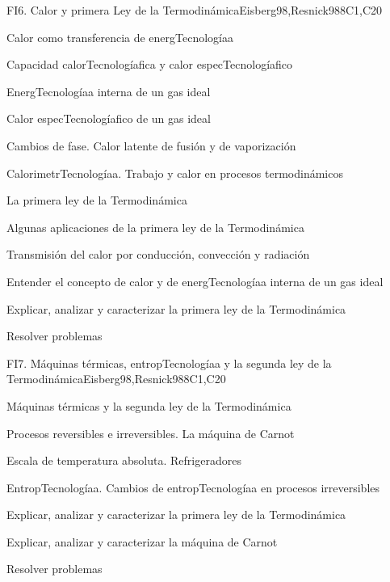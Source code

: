 \begin{syllabus}
\begin{unit}{FI6. Calor y primera Ley de la Termodinámica}{}{Eisberg98,Resnick98}{8}{C1,C20}
\begin{topics}
         \item  Calor como transferencia de energTecnologíaa
	 \item  Capacidad calorTecnologíafica y calor especTecnologíafico
         \item  EnergTecnologíaa interna de un gas ideal
	 \item  Calor especTecnologíafico de un gas ideal
         \item  Cambios de fase. Calor latente de fusión y de vaporización
	 \item  CalorimetrTecnologíaa. Trabajo y calor en procesos termodinámicos
         \item  La primera ley de la Termodinámica
	 \item  Algunas aplicaciones de la primera ley de la Termodinámica
         \item  Transmisión del calor por conducción, convección y radiación
   \end{topics}

   \begin{learningoutcomes}
         \item  Entender el concepto de calor y de energTecnologíaa interna de un gas ideal
         \item  Explicar, analizar y caracterizar la primera ley de la Termodinámica
         \item  Resolver problemas
   \end{learningoutcomes}
\end{unit}

\begin{unit}{FI7. Máquinas térmicas, entropTecnologíaa y la segunda ley de la Termodinámica}{}{Eisberg98,Resnick98}{8}{C1,C20}
\begin{topics}
         \item  Máquinas térmicas y la segunda ley de la Termodinámica
	 \item  Procesos reversibles e irreversibles. La máquina de Carnot
         \item  Escala de temperatura absoluta. Refrigeradores
	 \item  EntropTecnologíaa. Cambios de entropTecnologíaa en procesos irreversibles
   \end{topics}

   \begin{learningoutcomes}
         \item  Explicar, analizar y caracterizar la primera ley de la Termodinámica
         \item  Explicar, analizar y caracterizar la máquina de Carnot
         \item  Resolver problemas
   \end{learningoutcomes}
\end{unit}

\begin{coursebibliography}
\end{coursebibliography}

\end{syllabus}

%
